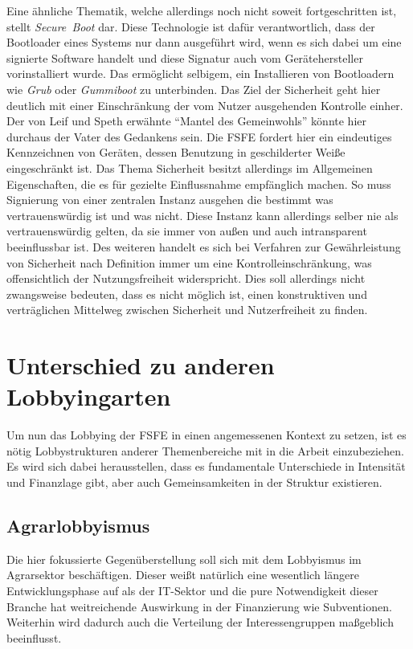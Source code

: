 Eine ähnliche Thematik, welche allerdings noch nicht soweit fortgeschritten 
ist, stellt \emph{Secure~Boot} dar. Diese Technologie ist dafür verantwortlich, 
dass \zB der Bootloader eines Systems nur dann ausgeführt wird, wenn es sich 
dabei um eine signierte Software handelt und diese Signatur auch vom 
Gerätehersteller vorinstalliert wurde. Das ermöglicht selbigem, ein 
Installieren von Bootloadern wie \emph{Grub} oder \emph{Gummiboot} zu 
unterbinden. Das Ziel der Sicherheit geht hier deutlich mit einer Einschränkung 
der vom Nutzer ausgehenden Kontrolle einher. Der von Leif und Speth erwähnte 
``Mantel des Gemeinwohls'' \cite{LeifSpeth200312} könnte hier durchaus der 
Vater des Gedankens sein. Die FSFE fordert hier ein eindeutiges Kennzeichnen 
von Geräten, dessen Benutzung in geschilderter Weiße eingeschränkt ist. 
\cite{FsfeSecureBoot} Das Thema Sicherheit besitzt allerdings im Allgemeinen 
Eigenschaften, die es für gezielte Einflussnahme empfänglich machen. So muss 
\zB Signierung von einer zentralen Instanz ausgehen die bestimmt was 
vertrauenswürdig ist und was nicht. Diese Instanz kann allerdings selber nie 
als vertrauenswürdig gelten, da sie immer von außen und auch intransparent 
beeinflussbar ist. Des weiteren handelt es sich bei Verfahren zur 
Gewährleistung von Sicherheit nach Definition immer um eine 
Kontrolleinschränkung, was offensichtlich der Nutzungsfreiheit widerspricht. 
Dies soll allerdings nicht zwangsweise bedeuten, dass es nicht möglich ist, 
einen konstruktiven und verträglichen Mittelweg zwischen Sicherheit und 
Nutzerfreiheit zu finden.

\section{Unterschied zu anderen Lobbyingarten}
Um nun das Lobbying der FSFE in einen angemessenen Kontext zu setzen, ist es 
nötig Lobbystrukturen anderer Themenbereiche mit in die Arbeit einzubeziehen. 
Es 
wird sich dabei herausstellen, dass es fundamentale Unterschiede in Intensität 
und Finanzlage gibt, aber auch Gemeinsamkeiten in der Struktur existieren.
\subsection{Agrarlobbyismus}
Die hier fokussierte Gegenüberstellung soll sich mit dem Lobbyismus im 
Agrarsektor 
beschäftigen. Dieser weißt natürlich eine wesentlich längere Entwicklungsphase 
auf als der IT-Sektor und die pure Notwendigkeit dieser Branche hat 
weitreichende Auswirkung in der Finanzierung wie \zB Subventionen. Weiterhin 
wird dadurch auch die Verteilung der Interessengruppen maßgeblich beeinflusst.

